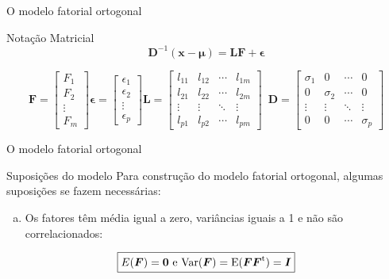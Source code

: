 \documentclass[
  ignorenonframetext,
  aspectratio=169,
]{beamer}
\providecommand{\tightlist}{%
  \setlength{\itemsep}{0pt}\setlength{\parskip}{0pt}}
\begin{document}
\begin{frame}{O modelo fatorial ortogonal}
\label{o-modelo-fatorial-ortogonal-1}
\begin{block}{Notação Matricial}
\label{notauxe7uxe3o-matricial}
\[\boxed{\boldsymbol{D}^{-1}(\mathbf{x} - \boldsymbol{\mu}) = \boldsymbol{L} \boldsymbol{F} + \boldsymbol{\epsilon}}\]

\[\boldsymbol{F} = \left[\begin{array}{c} F_1 \\ F_2 \\ \vdots \\ F_m \end{array} \right] \boldsymbol{\epsilon} = 
\left[\begin{array}{c} \epsilon_1 \\ \epsilon_2 \\ \vdots \\ \epsilon_p \end{array}\right]
\boldsymbol{L} = \left[ \begin{array}{cccc} l_{11} & l_{12} & \cdots & l_{1m} 
\\ l_{21} & l_{22} & \cdots & l_{2m} 
\\ \vdots & \vdots  & \ddots & \vdots 
\\ l_{p1} & l_{p2} & \cdots & l_{pm}
 \end{array} \right] \,\,\, \boldsymbol{D} = \left[ \begin{array}{cccc} \sigma_{1} & 0 & \cdots & 0 
\\ 0 & \sigma_{2} & \cdots & 0 
\\ \vdots & \vdots  & \ddots & \vdots 
\\ 0 & 0 & \cdots & \sigma_{p}
 \end{array} \right]\]
\end{block}
\end{frame}

\begin{frame}{O modelo fatorial ortogonal}
\label{o-modelo-fatorial-ortogonal-2}
\begin{block}{Suposições do modelo}
\label{suposiuxe7uxf5es-do-modelo}
Para construção do modelo fatorial ortogonal, algumas suposições se
fazem necessárias:

\vspace{0.5cm}

\begin{enumerate}
[a)]
\tightlist
\item
  Os fatores têm média igual a zero, variâncias iguais a 1 e não são
  correlacionados:
\end{enumerate}

\[\boxed{E({\boldsymbol{F}}) = \boldsymbol{0}\,\, \text{e} \,\, \rm{Var}({\boldsymbol{F}}) = E({\boldsymbol{F}}{\boldsymbol{F}}^t)  = \boldsymbol{I} }\]
\end{block}
\end{frame}
\end{document}
